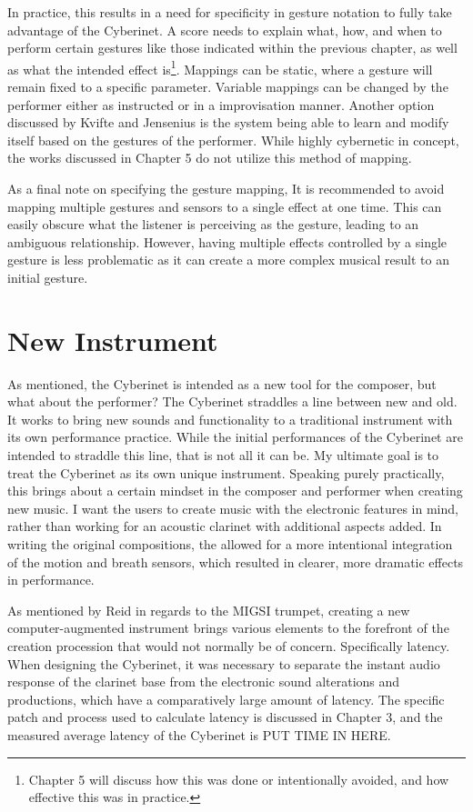 In practice, this results in a need for specificity in gesture notation to fully take advantage of the Cyberinet. A score needs to explain what, how, and when to perform certain gestures like those indicated within the previous chapter, as well as what the intended effect is\footnote{Chapter 5 will discuss how this was done or intentionally avoided, and how effective this was in practice.}. Mappings can be static, where a gesture will remain fixed to a specific parameter. Variable mappings can be changed by the performer either as instructed or in a improvisation manner. Another option discussed by Kvifte and Jensenius is the system being able to learn and modify itself based on the gestures of the performer\cite{KvifteJenseniusDescription}. While highly cybernetic in concept, the works discussed in Chapter 5 do not utilize this method of mapping.

As a final note on specifying the gesture mapping, It is recommended to avoid mapping multiple gestures and sensors to a single effect at one time. This can easily obscure what the listener is perceiving as the gesture, leading to an ambiguous relationship. However, having multiple effects controlled by a single gesture is less problematic as it can create a more complex musical result to an initial gesture.


\section{New Instrument}

As mentioned, the Cyberinet is intended as a new tool for the composer, but what about the performer? The Cyberinet straddles a line between new and old. It works to bring new sounds and functionality to a traditional instrument with its own performance practice. While the initial performances of the Cyberinet are intended to straddle this line, that is not all it can be. My ultimate goal is to treat the Cyberinet as its own unique instrument. Speaking purely practically, this brings about a certain mindset in the composer and performer when creating new music. I want the users to create music with the electronic features in mind, rather than working for an acoustic clarinet with additional aspects added. In writing the original compositions, the allowed for a more intentional integration of the motion and breath sensors, which resulted in clearer, more dramatic effects in performance.

As mentioned by Reid in regards to the MIGSI trumpet, creating a new computer-augmented instrument brings various elements to the forefront of the creation procession that would not normally be of concern. Specifically latency\cite{reid_2019}. When designing the Cyberinet, it was necessary to separate the instant audio response of the clarinet base from the electronic sound alterations and productions, which have a comparatively large amount of latency. The specific patch and process used to calculate latency is discussed in Chapter 3, and the measured average latency of the Cyberinet is PUT TIME IN HERE.


